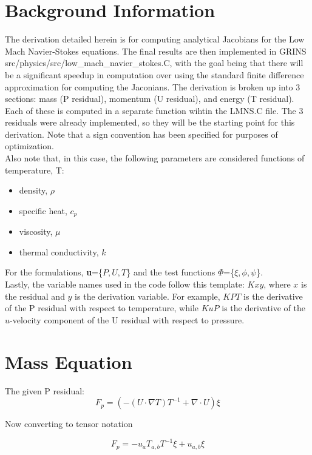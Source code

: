 \section{Background Information}
The derivation detailed herein is for computing analytical Jacobians for the Low Mach Navier-Stokes equations. The final results are then implemented in GRINS src/physics/src/low\_mach\_navier\_stokes.C, with the goal being that there
will be a significant speedup in computation over using the standard finite difference approximation for computing the Jaconians. The derivation is broken up into 3 sections: mass (P residual), momentum (U residual), and energy (T residual).
Each of these is computed in a separate function wihtin the LMNS.C file.  The 3 residuals were already implemented, so they will be the starting point for this derivation. Note that a sign convention has been specified for 
purposes of optimization.\\
Also note that, in this case, the following parameters are considered functions of temperature, T:
\begin{itemize}
    \item density, $\rho$
    \item specific heat, $c_p$
    \item viscosity, $\mu$
    \item thermal conductivity, $k$
\end{itemize}
For the formulations, \textbf{u}=\{$P,U,T$\} and the test functions \textbf{$\Phi$}=\{$\xi,\phi,\psi$\}.\\
Lastly, the variable names used in the code follow this template: $Kxy$, where $x$ is the residual and $y$ is the derivation variable.  For example, $KPT$ is the derivative of the P residual with respect to temperature,
while $KuP$ is the derivative of the $u$-velocity component of the U residual with respect to pressure. 


\section{Mass Equation}
The given P residual:
\begin{equation}
    F_p = (-(U \cdot \nabla T) T^{-1} + \nabla \cdot U)\xi
\end{equation}

Now converting to tensor notation

\begin{equation}
    F_p = -u_a T_{a,b} T^{-1} \xi + u_{a,b}\xi
\end{equation}

